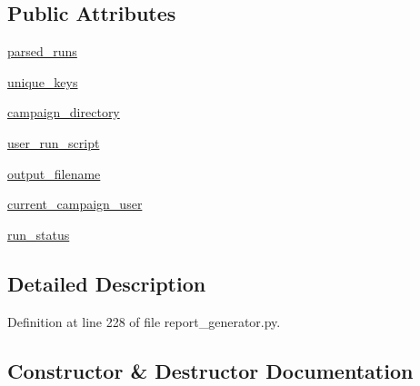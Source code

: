 \subsection*{Public Attributes}
\begin{DoxyCompactItemize}
\item 
\hyperlink{classcodar_1_1cheetah_1_1report__generator_1_1___report_generator_af5983f5a2603bb38de232b90a2affcf0}{parsed\+\_\+runs}
\item 
\hyperlink{classcodar_1_1cheetah_1_1report__generator_1_1___report_generator_a73698949e3788323ca22ebec86049be4}{unique\+\_\+keys}
\item 
\hyperlink{classcodar_1_1cheetah_1_1report__generator_1_1___report_generator_af615220380d67caed4686343b50f5f0b}{campaign\+\_\+directory}
\item 
\hyperlink{classcodar_1_1cheetah_1_1report__generator_1_1___report_generator_a868bf9c8f33e399015e09703424aa7d3}{user\+\_\+run\+\_\+script}
\item 
\hyperlink{classcodar_1_1cheetah_1_1report__generator_1_1___report_generator_aa91a80020bdeb52076dfa246ca9d84be}{output\+\_\+filename}
\item 
\hyperlink{classcodar_1_1cheetah_1_1report__generator_1_1___report_generator_ae7bfc4146cf2927345e9d4fee0fdd86d}{current\+\_\+campaign\+\_\+user}
\item 
\hyperlink{classcodar_1_1cheetah_1_1report__generator_1_1___report_generator_a466c90c90ebd859906cd2745a8341134}{run\+\_\+status}
\end{DoxyCompactItemize}


\subsection{Detailed Description}
\begin{DoxyVerb}\end{DoxyVerb}
 

Definition at line 228 of file report\+\_\+generator.\+py.



\subsection{Constructor \& Destructor Documentation}
\mbox{\label{classcodar_1_1cheetah_1_1report__generator_1_1___report_generator_aaadff1978efa6b29137c24a5ae751a0a}} 
